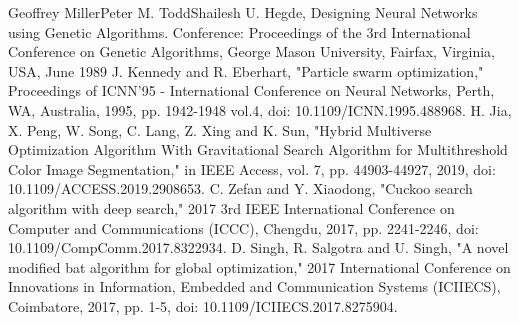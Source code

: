 \documentclass[conference]{IEEEtran}
\begin{document}
\begin{thebibliography}{00}
 Geoffrey MillerPeter M. ToddShailesh U. Hegde, Designing Neural Networks using Genetic Algorithms. Conference: Proceedings of the 3rd International Conference on Genetic Algorithms, George Mason University, Fairfax, Virginia, USA, June 1989
J. Kennedy and R. Eberhart, "Particle swarm optimization," Proceedings of ICNN'95 - International Conference on Neural Networks, Perth, WA, Australia, 1995, pp. 1942-1948 vol.4, doi: 10.1109/ICNN.1995.488968.
H. Jia, X. Peng, W. Song, C. Lang, Z. Xing and K. Sun, "Hybrid Multiverse Optimization Algorithm With Gravitational Search Algorithm for Multithreshold Color Image Segmentation," in IEEE Access, vol. 7, pp. 44903-44927, 2019, doi: 10.1109/ACCESS.2019.2908653.
C. Zefan and Y. Xiaodong, "Cuckoo search algorithm with deep search," 2017 3rd IEEE International Conference on Computer and Communications (ICCC), Chengdu, 2017, pp. 2241-2246, doi: 10.1109/CompComm.2017.8322934.
D. Singh, R. Salgotra and U. Singh, "A novel modified bat algorithm for global optimization," 2017 International Conference on Innovations in Information, Embedded and Communication Systems (ICIIECS), Coimbatore, 2017, pp. 1-5, doi: 10.1109/ICIIECS.2017.8275904.
\end{thebibliography}
\end{document}
